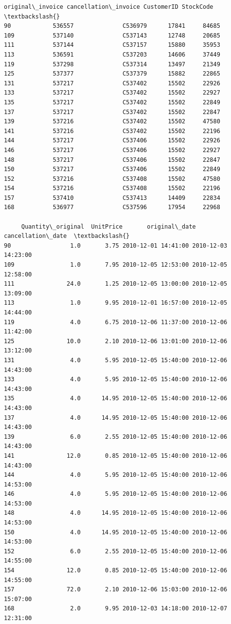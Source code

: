 \documentclass[11pt]{article}
\begin{document}
    
    \begin{Verbatim}[commandchars=\\\{\}]
    original\_invoice cancellation\_invoice CustomerID StockCode  \textbackslash{}
90            536557              C536979      17841     84685   
109           537140              C537143      12748     20685   
111           537144              C537157      15880     35953   
113           536591              C537203      14606     37449   
119           537298              C537314      13497     21349   
125           537377              C537379      15882     22865   
131           537217              C537402      15502     22926   
133           537217              C537402      15502     22927   
135           537217              C537402      15502     22849   
137           537217              C537402      15502     22847   
139           537216              C537402      15502     47580   
141           537216              C537402      15502     22196   
144           537217              C537406      15502     22926   
146           537217              C537406      15502     22927   
148           537217              C537406      15502     22847   
150           537217              C537406      15502     22849   
152           537216              C537408      15502     47580   
154           537216              C537408      15502     22196   
157           537410              C537413      14409     22834   
168           536977              C537596      17954     22968   

     Quantity\_original  UnitPrice       original\_date   cancellation\_date  \textbackslash{}
90                 1.0       3.75 2010-12-01 14:41:00 2010-12-03 14:23:00   
109                1.0       7.95 2010-12-05 12:53:00 2010-12-05 12:58:00   
111               24.0       1.25 2010-12-05 13:00:00 2010-12-05 13:09:00   
113                1.0       9.95 2010-12-01 16:57:00 2010-12-05 14:44:00   
119                4.0       6.75 2010-12-06 11:37:00 2010-12-06 11:42:00   
125               10.0       2.10 2010-12-06 13:01:00 2010-12-06 13:12:00   
131                4.0       5.95 2010-12-05 15:40:00 2010-12-06 14:43:00   
133                4.0       5.95 2010-12-05 15:40:00 2010-12-06 14:43:00   
135                4.0      14.95 2010-12-05 15:40:00 2010-12-06 14:43:00   
137                4.0      14.95 2010-12-05 15:40:00 2010-12-06 14:43:00   
139                6.0       2.55 2010-12-05 15:40:00 2010-12-06 14:43:00   
141               12.0       0.85 2010-12-05 15:40:00 2010-12-06 14:43:00   
144                4.0       5.95 2010-12-05 15:40:00 2010-12-06 14:53:00   
146                4.0       5.95 2010-12-05 15:40:00 2010-12-06 14:53:00   
148                4.0      14.95 2010-12-05 15:40:00 2010-12-06 14:53:00   
150                4.0      14.95 2010-12-05 15:40:00 2010-12-06 14:53:00   
152                6.0       2.55 2010-12-05 15:40:00 2010-12-06 14:55:00   
154               12.0       0.85 2010-12-05 15:40:00 2010-12-06 14:55:00   
157               72.0       2.10 2010-12-06 15:03:00 2010-12-06 15:07:00   
168                2.0       9.95 2010-12-03 14:18:00 2010-12-07 12:31:00   


\end{Verbatim}
\end{document}
